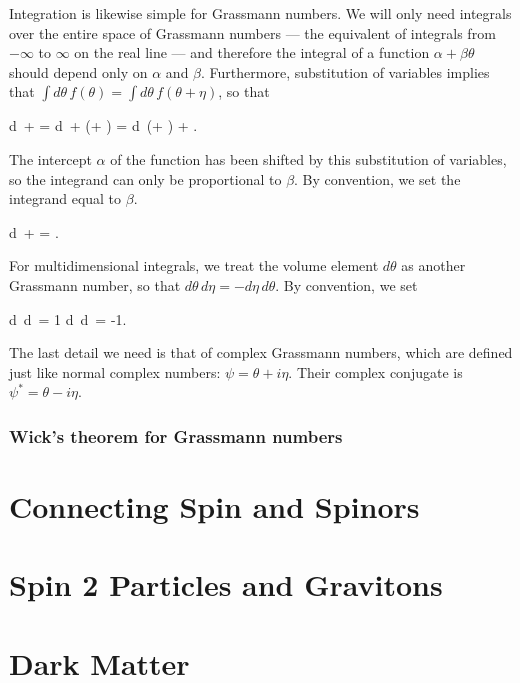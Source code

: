 Integration is likewise simple for Grassmann numbers. We will only need integrals over the entire space of Grassmann numbers --- the equivalent of integrals from $-\infty$ to $\infty$ on the real line --- and therefore the integral of a function $\alpha + \beta \theta$ should depend only on $\alpha$ and $\beta$. Furthermore, substitution of variables implies that $\int d\theta\, f(\theta) = \int d\theta\, f(\theta + \eta)$, so that
\begin{e}
  \int d\theta\, \alpha +  \beta\theta = \int d\theta\, \alpha +  \beta(\theta + \eta) = \int d\theta\, (\alpha + \beta \eta) + \beta \theta.
\end{e}
The intercept $\alpha$ of the function has been shifted by this substitution of variables, so the integrand can only be proportional to $\beta$. By convention, we set the integrand equal to $\beta$.
\begin{e}
  \int d\theta\, \alpha +  \beta\theta = \beta.
\end{e}
For multidimensional integrals, we treat the volume element $d\theta$ as another Grassmann number, so that $d\theta\,d\eta = -d\eta \, d\theta$. By convention, we set
\begin{e}
  \int d\eta\, d\theta\, \theta \eta = 1 \implies \int d\theta\, d\eta\, \theta \eta = -1.
\end{e}

The last detail we need is that of complex Grassmann numbers, which are defined just like normal complex numbers: $\psi = \theta + i\eta$. Their complex conjugate is $\psi^* = \theta - i\eta$.

\subsection{Wick's theorem for Grassmann numbers}



\chapter{Connecting Spin and Spinors}
\label{app:spin-spinors}



\chapter{Spin 2 Particles and Gravitons}



\chapter{Dark Matter}




